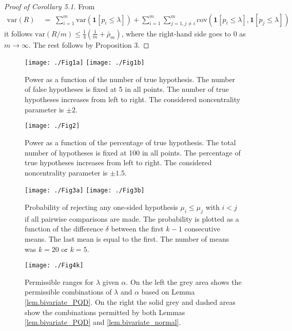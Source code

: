 \documentclass {imsart}
\newcommand{\var}{\mathrm{var}}
\begin{document}
\begin{proof}[Proof of Corollary 5.1]
From
\begin{align*}
\var(R)&\;=\;\sum\limits_{i=1}^{m}{\var(\mathbf{1}[p_i\le\lambda ])
+\sum\limits_{i=1}^{m}{\sum\limits_{j=1,j\ne i}^{m}{\text{cov}(\mathbf{1}[p_i\le\lambda],\mathbf{1}[{{p}_{j}}\le \lambda ])}}}
\end{align*}
it follows $\var(R/m)\le \frac{1}{4}(\frac{1}{m}+\bar\rho_m)$, where the right-hand side goes to 0 as $m\to\infty$. The rest follows by Proposition 3.
\end{proof}








\begin{figure}[!p]
\centering
\texttt{[image: ./Fig1a]}
\texttt{[image: ./Fig1b]}
\caption[Power and m]{Power as a function of the number of true hypothesis. The number of false hypotheses is fixed at 5 in all points. The number of true hypotheses increases from left to right. The considered noncentrality parameter is $\pm 2$.}
\label{fig:figureM}
\end{figure}


\begin{figure}[!p]
\centering
\texttt{[image: ./Fig2]}
\caption[Power and percentage]{Power as a function of the percentage of true hypothesis. The total number of hypotheses is fixed at 100 in all points. The percentage of true hypotheses increases from left to right. The considered noncentrality parameter is $\pm 1.5$.}
\label{fig:figureP2}
\end{figure}

\begin{figure}[!p]
\centering
\texttt{[image: ./Fig3a]}
\texttt{[image: ./Fig3b]}
\caption[Power in pairwise comparisons]{Probability of rejecting any one-sided hypothesis $\mu_i\leq\mu_j$ with $i < j$ if all pairwise comparisons are made. The probability is plotted as a function of the difference $\delta$ between the first $k-1$ consecutive means. The last mean is equal to the first. The number of means was $k=20$ or $k=5$.}
\label{fig:figurePairs}
\end{figure}


\begin{figure}[!p]
\begin{center}
\texttt{[image: ./Fig4k]}
\end{center}
\caption{Permissible ranges for $\lambda$ given $\alpha$. On the left the grey area shows the permissible combinations of $\lambda$ and $\alpha$ based on Lemma \ref{lem.bivariate_PQD}. On the right the solid grey and dashed areas show the combinations permitted by both Lemmas \ref{lem.bivariate_PQD} and \ref{lem.bivariate_normal}.}
\label{fig.lambda_ok_rough_QPD}
\end{figure}
\end{document}
